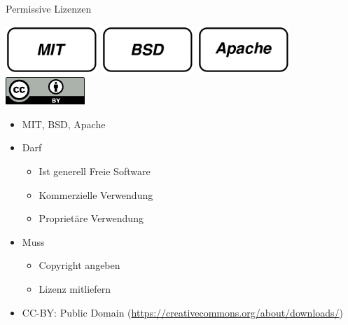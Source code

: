 {\begin{frame}{Permissive Lizenzen}
	\begin{center}
		\includegraphics[width=3.5cm]{res/mit-logo.pdf}
		\hfill
		\includegraphics[width=3.5cm]{res/bsd-logo.pdf}
		\hfill
		\includegraphics[width=3.5cm]{res/apache-logo.pdf}
		\\
		\vspace{1cm}
		\includegraphics[width=3cm]{res/cc-by.pdf}
	\end{center}
\end{frame}
\note
{
	\begin{itemize}
		\item MIT, BSD, Apache
		\item Darf
		\begin{itemize}
			\item Ist generell Freie Software
			\item Kommerzielle Verwendung
			\item Proprietäre Verwendung
		\end{itemize}
		\item Muss
		\begin{itemize}
			\item Copyright angeben
			\item Lizenz mitliefern
		\end{itemize}
		\item CC-BY: Public Domain (\url{https://creativecommons.org/about/downloads/})
	\end{itemize}
}

}
